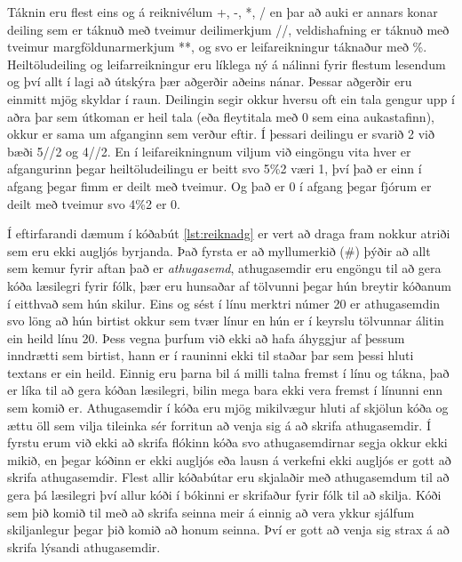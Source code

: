 Táknin eru flest eins og á reiknivélum +, -, *, / en þar að auki er annars konar deiling sem er táknuð með tveimur deilimerkjum //, veldishafning er táknuð með tveimur margföldunarmerkjum **, og svo er leifareikningur táknaður með \%.
Heiltöludeiling og leifarreikningur eru líklega ný á nálinni fyrir flestum lesendum og því allt í lagi að útskýra þær aðgerðir aðeins nánar.
Þessar aðgerðir eru einmitt mjög skyldar í raun.
Deilingin segir okkur hversu oft ein tala gengur upp í aðra þar sem útkoman er heil tala (eða fleytitala með 0 sem eina aukastafinn), okkur er sama um afganginn sem verður eftir.
Í þessari deilingu er svarið 2 við bæði 5//2 og 4//2.
En í leifareikningnum viljum við eingöngu vita hver er afgangurinn þegar heiltöludeilingu er beitt svo 5\%2 væri 1, því það er einn í afgang þegar fimm er deilt með tveimur.
Og það er 0 í afgang þegar fjórum er deilt með tveimur svo 4\%2 er 0.

Í eftirfarandi dæmum í kóðabút \ref{lst:reiknadg} er vert að draga fram nokkur atriði sem eru ekki augljós byrjanda. 
Það fyrsta er að myllumerkið (\#) þýðir að allt sem kemur fyrir aftan það er \textit{athugasemd}, athugasemdir eru engöngu til að gera kóða læsilegri fyrir fólk, þær eru hunsaðar af tölvunni þegar hún breytir kóðanum í eitthvað sem hún skilur.
Eins og sést í línu merktri númer 20 er athugasemdin svo löng að hún birtist okkur sem tvær línur en hún er í keyrslu tölvunnar álitin ein heild línu 20.
Þess vegna þurfum við ekki að hafa áhyggjur af þessum inndrætti sem birtist, hann er í rauninni ekki til staðar þar sem þessi hluti textans er ein heild.
Einnig eru þarna bil á milli talna fremst í línu og tákna, það er líka til að gera kóðan læsilegri, bilin mega bara ekki vera fremst í línunni enn sem komið er.
Athugasemdir í kóða eru mjög mikilvægur hluti af skjölun kóða og ættu öll sem vilja tileinka sér forritun að venja sig á að skrifa athugasemdir.
Í fyrstu erum við ekki að skrifa flókinn kóða svo athugasemdirnar segja okkur ekki mikið, en þegar kóðinn er ekki augljós eða lausn á verkefni ekki augljós er gott að skrifa athugasemdir.
Flest allir kóðabútar eru skjalaðir með athugasemdum til að gera þá læsilegri því allur kóði í bókinni er skrifaður fyrir fólk til að skilja.
Kóði sem þið komið til með að skrifa seinna meir á einnig að vera ykkur sjálfum skiljanlegur þegar þið komið að honum seinna.
Því er gott að venja sig strax á að skrifa lýsandi athugasemdir. 

